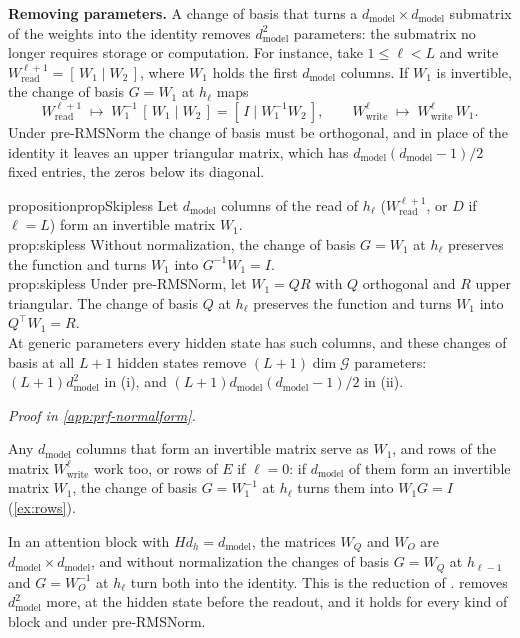 \documentclass[10pt]{article}
\theoremstyle{definition}
\theoremstyle{remark}
\newcommand{\Wread}{W_{\mathrm{read}}}
\newcommand{\Wwrite}{W_{\mathrm{write}}}
\newcommand{\dm}{d_{\mathrm{model}}}
\newcommand{\G}{\mathcal{G}}
\newcommand{\para}[1]{\smallskip\noindent\textbf{#1}\hspace{0.5em}}
\newcommand{\ptlabel}[1]{\phantomsection\label{#1}}
\newcommand{\proofin}[1]{\par\vspace{-0.4\baselineskip}\noindent\hfill{\small\itshape Proof in \cref{#1}.}\par\smallskip}
\newcommand{\stpart}[3]{\ifx\relax#1\relax\else\ptlabel{#1:#2}\fi{\upshape\bfseries\boldmath(#2)\ifx\relax#3\relax\else\ #3.\fi}}
\begin{document}
\para{Removing parameters.} A change of basis that turns a $\dm\times\dm$ submatrix of the weights into the identity removes $\dm^2$ parameters: the submatrix no longer requires storage or computation. For instance, take $1 \le \ell < L$ and write $\Wread^{\ell+1} = [\,W_1 \mid W_2\,]$, where $W_1$ holds the first $\dm$ columns. If $W_1$ is invertible, the change of basis $G = W_1$ at $h_\ell$ maps
\[
\Wread^{\ell+1} \;\mapsto\; W_1^{-1}\,[\,W_1 \mid W_2\,] = [\,I \mid W_1^{-1}W_2\,], \qquad \Wwrite^{\ell} \;\mapsto\; \Wwrite^{\ell}\,W_1 .
\]
Under pre-RMSNorm the change of basis must be orthogonal, and in place of the identity it leaves an upper triangular matrix, which has $\dm(\dm-1)/2$ fixed entries, the zeros below its diagonal.

\begin{restatable}{proposition}{propSkipless}\label{prop:skipless}
Let $\dm$ columns of the read of $h_\ell$ ($\Wread^{\ell+1}$, or $D$ if $\ell = L$) form an invertible matrix $W_1$.\\
\stpart{prop:skipless}{i}{} Without normalization, the change of basis $G = W_1$ at $h_\ell$ preserves the function and turns $W_1$ into $G^{-1}W_1 = I$.\\
\stpart{prop:skipless}{ii}{} Under pre-RMSNorm, let $W_1 = QR$ with $Q$ orthogonal and $R$ upper triangular. The change of basis $Q$ at $h_\ell$ preserves the function and turns $W_1$ into $Q^\top W_1 = R$.\\
At generic parameters every hidden state has such columns, and these changes of basis at all $L+1$ hidden states remove $(L+1)\dim\G$ parameters: $(L+1)\dm^2$ in (i), and $(L+1)\dm(\dm-1)/2$ in (ii).
\end{restatable}
\proofin{app:prf-normalform}

Any $\dm$ columns that form an invertible matrix serve as $W_1$, and rows of the matrix $\Wwrite^{\ell}$ work too, or rows of $E$ if $\ell = 0$: if $\dm$ of them form an invertible matrix $W_1$, the change of basis $G = W_1^{-1}$ at $h_\ell$ turns them into $W_1G = I$ (\cref{ex:rows}).

In an attention block with $Hd_h = \dm$, the matrices $W_Q$ and $W_O$ are $\dm\times\dm$, and without normalization the changes of basis $G = W_Q$ at $h_{\ell-1}$ and $G = W_O^{-1}$ at $h_\ell$ turn both into the identity. This is the reduction of \citet{graef2024tricks}.  removes $\dm^2$ more, at the hidden state before the readout, and it holds for every kind of block and under pre-RMSNorm.
\end{document}
